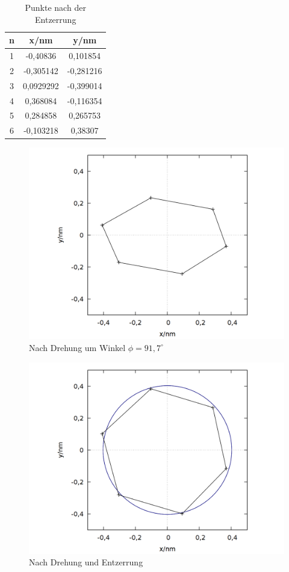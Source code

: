 \begin{table}
\centering
\caption{Punkte nach der Entzerrung}
\begin{tabular}{ccc}
\toprule
n & x/nm & y/nm\\
\midrule
1&	-0,40836&	0,101854\\
2&	-0,305142&	-0,281216\\
3& 0,0929292&	-0,399014\\
4&	0,368084&	-0,116354\\
5&	0,284858&	0,265753\\
6&	-0,103218&	0,38307\\
\bottomrule
\end{tabular}
\label{tab:fit}
\end{table}

\begin{figure}
\centering
\includegraphics[scale=0.3]{data/graphit/out_rotate_old.png}
\caption{Nach Drehung um Winkel $\phi = 91,7^\circ$}
\label{fig:fit1}
\end{figure}

\begin{figure}
\centering
\includegraphics[scale=0.3]{data/graphit/out_rotate.png}
\caption{Nach Drehung und Entzerrung}
\label{fig:fit2}
\end{figure}

